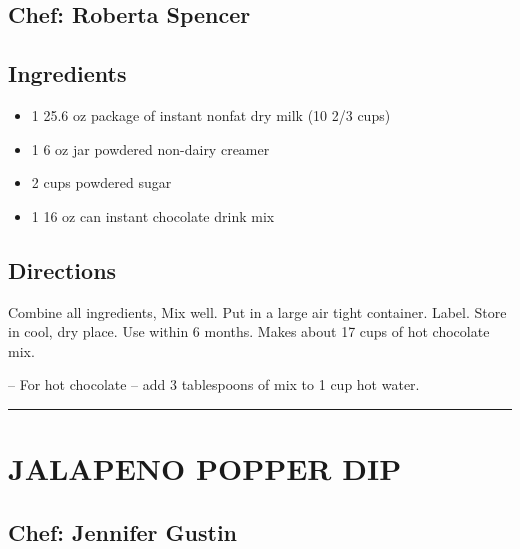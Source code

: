 \documentclass[
]{book}
\providecommand{\tightlist}{%
  \setlength{\itemsep}{0pt}\setlength{\parskip}{0pt}}
\begin{document}
\hypertarget{chef-roberta-spencer}{%
\subsection*{Chef: Roberta Spencer}\label{chef-roberta-spencer}}

\hypertarget{ingredients-7}{%
\subsection*{Ingredients}\label{ingredients-7}}

\begin{itemize}
\tightlist
\item
  1 25.6 oz package of instant nonfat dry milk (10 2/3 cups)
\item
  1 6 oz jar powdered non-dairy creamer
\item
  2 cups powdered sugar
\item
  1 16 oz can instant chocolate drink mix
\end{itemize}

\hypertarget{directions-7}{%
\subsection*{Directions}\label{directions-7}}

Combine all ingredients, Mix well. Put in a large air tight container.
Label. Store in cool, dry place. Use within 6 months. Makes about 17 cups of hot chocolate mix.

-- For hot chocolate -- add 3 tablespoons of mix to 1 cup hot water.

\begin{center}\rule{0.5\linewidth}{0.5pt}\end{center}

\hypertarget{jalapeno-popper-dip}{%
\section*{JALAPENO POPPER DIP}\label{jalapeno-popper-dip}}

\hypertarget{chef-jennifer-gustin-2}{%
\subsection*{Chef: Jennifer Gustin}\label{chef-jennifer-gustin-2}}
\end{document}
